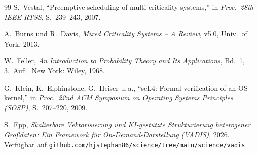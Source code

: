 ﻿\documentclass[a4paper,12pt]{scrreprt}
\theoremstyle{definition}
\begin{document}
\begin{thebibliography}{99}
		S.\ Vestal,
		``Preemptive scheduling of multi-criticality systems,''
		in \textit{Proc.\ 28th IEEE RTSS}, S.~239--243, 2007.
		
		A.\ Burns und R.\ Davis,
		\textit{Mixed Criticality Systems -- A Review},
		v5.0, Univ.\ of York, 2013.
		
		W.\ Feller,
		\textit{An Introduction to Probability Theory and Its Applications},
		Bd.~1, 3.~Aufl.\ New York: Wiley, 1968.

		G.\ Klein, K.\ Elphinstone, G.\ Heiser u.\,a.,
		``seL4: Formal verification of an OS kernel,''
		in \textit{Proc.\ 22nd ACM Symposium on Operating Systems Principles (SOSP)},
		S.~207--220, 2009.

		S.\ Epp,
		\textit{Skalierbare Vektorisierung und KI-gestützte Strukturierung heterogener
		Großdaten: Ein Framework für On-Demand-Darstellung (VADIS)}, 2026. Verfügbar auf
		\texttt{github.com/hjstephan86/science/tree/main/science/vadis}
		
	\end{thebibliography}
	
\end{document}
